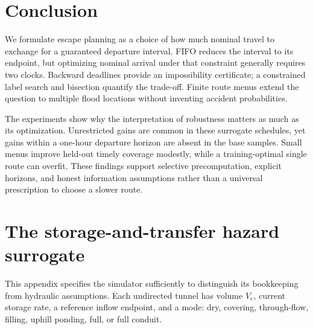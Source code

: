 \documentclass[11pt]{article}
\begin{document}
\section{Conclusion}
We formulate escape planning as a choice of how much nominal travel to exchange for a guaranteed departure interval. FIFO reduces the interval to its endpoint, but optimizing nominal arrival under that constraint generally requires two clocks. Backward deadlines provide an impossibility certificate; a constrained label search and bisection quantify the trade-off. Finite route menus extend the question to multiple flood locations without inventing accident probabilities.

The experiments show why the interpretation of robustness matters as much as its optimization. Unrestricted gains are common in these surrogate schedules, yet gains within a one-hour departure horizon are absent in the base samples. Small menus improve held-out timely coverage modestly, while a training-optimal single route can overfit. These findings support selective precomputation, explicit horizons, and honest information assumptions rather than a universal prescription to choose a slower route.

\appendix
\section{The storage-and-transfer hazard surrogate}
\label{app:flood}
This appendix specifies the simulator sufficiently to distinguish its bookkeeping from hydraulic assumptions. Each undirected tunnel has volume $V_e$, current storage rate, a reference inflow endpoint, and a mode: dry, covering, through-flow, filling, uphill ponding, full, or full conduit.
\end{document}
